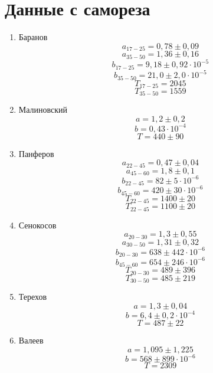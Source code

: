 \documentclass[a4paper, 12pt]{article}
\begin{document}
    \section{Данные с  самореза}
    \begin{enumerate}
        \item Баранов
        $$a_{17-25}=0{,}78\pm 0{,}09$$
        $$a_{35-50}=1{,}36\pm 0{,}16$$
        $$b_{17-25}=9{,}18\pm 0{,}92\cdot 10^{-5}$$
        $$b_{35-50}=21{,}0\pm 2{,}0\cdot 10^{-5}$$
        $$T_{17-25}=2045$$
        $$T_{35-50}=1559$$
        \item Малиновский
        $$a=1{,}2\pm 0{,}2$$
        $$b=0{,}43\cdot 10^{-4}$$
        $$T=440\pm90$$
        \item Панферов
        $$a_{22-45}=0{,}47\pm 0{,}04$$
        $$a_{45-60}=1{,}8\pm 0{,}1$$
        $$b_{22-45}=82\pm5\cdot 10^{-6}$$
        $$b_{45-60}=420\pm30\cdot 10^{-6}$$
        $$T_{22-45}=1400\pm 20$$
        $$T_{22-45}=1100\pm 20$$
        \item Сенокосов
        $$a_{20-30}=1{,}3\pm 0{,}55$$
        $$a_{30-50}=1{,}31\pm 0{,}32$$
        $$b_{20-30}=638\pm442\cdot 10^{-6}$$
        $$b_{45-60}=654\pm246\cdot 10^{-6}$$
        $$T_{20-30}=489\pm 396$$
        $$T_{30-50}=485\pm 219$$
        \item Терехов
        $$a=1{,}3\pm 0{,}04$$
        $$b=6{,}4\pm 0{,}2\cdot 10^{-4}$$
        $$T=487\pm 22$$
        \item Валеев
        $$a=1{,}095\pm 1{,}225$$
        $$b=568\pm 899\cdot 10^{-6}$$
        $$T=2309$$
    \end{enumerate}
\end{document}
